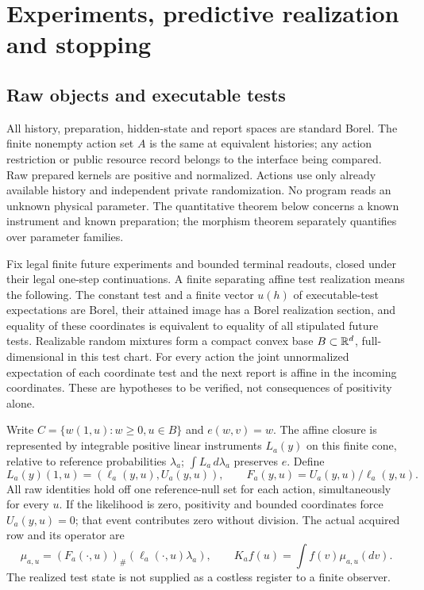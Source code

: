 \section{Experiments, predictive realization and stopping}\label{sec:experiments}
\subsection{Raw objects and executable tests}
All history, preparation, hidden-state and report spaces are standard Borel. The finite nonempty action set $A$ is the same at equivalent histories; any action restriction or public resource record belongs to the interface being compared. Raw prepared kernels are positive and normalized. Actions use only already available history and independent private randomization. No program reads an unknown physical parameter. The quantitative theorem below concerns a known instrument and known preparation; the morphism theorem separately quantifies over parameter families.

Fix legal finite future experiments and bounded terminal readouts, closed under their legal one-step continuations. A finite separating affine test realization means the following. The constant test and a finite vector $u(h)$ of executable-test expectations are Borel, their attained image has a Borel realization section, and equality of these coordinates is equivalent to equality of all stipulated future tests. Realizable random mixtures form a compact convex base $B\subset\mathbb R^d$, full-dimensional in this test chart. For every action the joint unnormalized expectation of each coordinate test and the next report is affine in the incoming coordinates. These are hypotheses to be verified, not consequences of positivity alone.

Write $C=\{w(1,u):w\ge0,u\in B\}$ and $e(w,v)=w$. The affine closure is represented by integrable positive linear instruments $L_a(y)$ on this finite cone, relative to reference probabilities $\lambda_a$; $\int L_a\,d\lambda_a$ preserves $e$. Define
\begin{equation}\label{eq:instrument}
 L_a(y)(1,u)=(\ell_a(y,u),U_a(y,u)),\qquad
 F_a(y,u)=U_a(y,u)/\ell_a(y,u).
\end{equation}
All raw identities hold off one reference-null set for each action, simultaneously for every $u$. If the likelihood is zero, positivity and bounded coordinates force $U_a(y,u)=0$; that event contributes zero without division. The actual acquired row and its operator are
\begin{equation}\label{eq:row}
 \mu_{a,u}=(F_a(\cdot,u))_\#(\ell_a(\cdot,u)\lambda_a),
 \qquad K_af(u)=\int f(v)\mu_{a,u}(dv).
\end{equation}
The realized test state is not supplied as a costless register to a finite observer.

